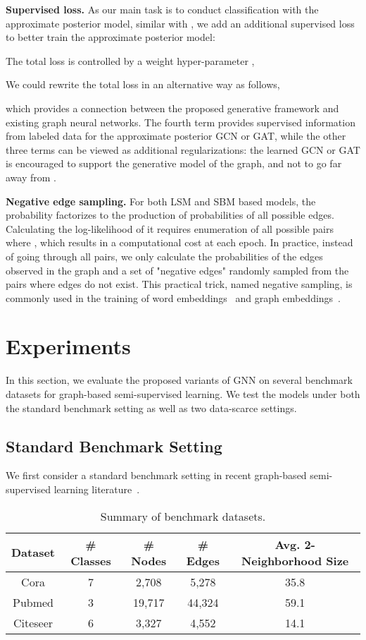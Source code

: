 \documentclass{article}
\newcommand{\vpara}[1]{\vspace{0.05in}\noindent\textbf{#1 }}
\begin{document}
\vpara{Supervised loss.}
As our main task is to conduct classification with the approximate posterior model, similar with \citet{kingma2014semi}, we add an additional supervised loss to better train the approximate posterior model:

The total loss is controlled by a weight hyper-parameter , 


We could rewrite the total loss in an alternative way as follows,

which provides a connection between the proposed generative framework and existing graph neural networks. The fourth term  provides supervised information from labeled data for the approximate posterior GCN or GAT, while the other three terms can be viewed as additional regularizations: the learned GCN or GAT is encouraged to support the generative model of the graph, and not to go far away from .

\vpara{Negative edge sampling.}
For both LSM and SBM based models, the probability  factorizes to the production of probabilities of all possible edges. Calculating the log-likelihood of it requires enumeration of all possible  pairs where , which results in a  computational cost at each epoch. In practice, instead of going through all  pairs, we only calculate the probabilities of the edges observed in the graph and a set of "negative edges" randomly sampled from the  pairs where edges do not exist. This practical trick, named negative sampling, is commonly used in the training of word embeddings~\cite{mikolov2013efficient} and graph embeddings~\cite{tang2015line}. 
 \section{Experiments}
\label{sec:exp}

In this section, we evaluate the proposed variants of GNN on several benchmark datasets for graph-based semi-supervised learning. We test the models under both the standard benchmark setting \cite{yang2016revisiting} as well as two data-scarce settings.  

\subsection{Standard Benchmark Setting}

We first consider a standard benchmark setting in recent graph-based semi-supervised learning literature~\cite{yang2016revisiting,kipf2016semi,velivckovic2017graph}. 

\begin{table}[tb]
\centering
\caption{Summary of benchmark datasets.}
\label{tbl:dataset}
\begin{tabular}{ccccc}
\toprule
Dataset & \# Classes & \# Nodes & \# Edges & Avg. 2-Neighborhood Size\\
\midrule
Cora & 7& 2,708& 5,278& 35.8\\
Pubmed & 3& 19,717& 44,324& 59.1\\
Citeseer & 6& 3,327& 4,552& 14.1\\
\bottomrule
\end{tabular}

\end{table}
\end{document}
